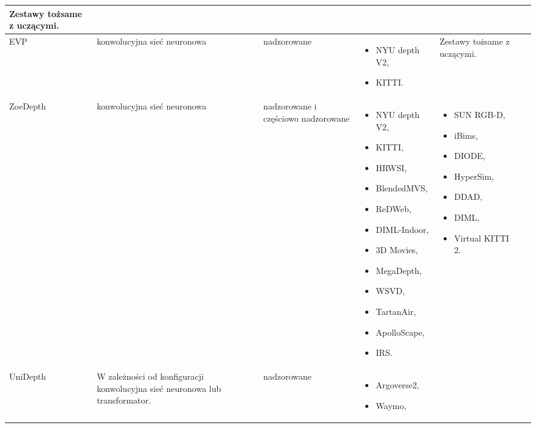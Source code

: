\begin{table}[H]
{\begin{tabular}{ |l|p{2cm}|p{2cm}|p{5cm}|p{5cm}|r| }
        Zestawy tożsame z uczącymi.\\
        \hline
        EVP \cite{lavreniuk2023} &
        konwolucyjna sieć neuronowa &
        nadzorowane &
        \begin{itemize} 
            \item NYU depth V2,
            \item KITTI.
        \end{itemize} & 
        Zestawy tożsame z uczącymi.\\
        \hline
        ZoeDepth \cite{bhat2023} &
        konwolucyjna sieć neuronowa &
        nadzorowane i częściowo nadzorowane &
        \begin{itemize} 
            \item NYU depth V2,
            \item KITTI,
            \item HRWSI,
            \item BlendedMVS,
            \item ReDWeb,
            \item DIML-Indoor,
            \item 3D Movies,
            \item MegaDepth,
            \item WSVD,
            \item TartanAir,
            \item ApolloScape,
            \item IRS.
        \end{itemize} & 
        \begin{itemize} 
            \item SUN RGB-D,
            \item iBims,
            \item DIODE,
            \item HyperSim,
            \item DDAD,
            \item DIML,
            \item Virtual KITTI 2.
        \end{itemize}\\
        \hline
        UniDepth \cite{piccinelli2024} &
        W zależności od konfiguracji konwolucyjna sieć neuronowa lub transformator. &
        nadzorowane &
        \begin{itemize}
        \item Argoverse2,
        \item Waymo,

\end{itemize}
\end{tabular}}
\end{table}
